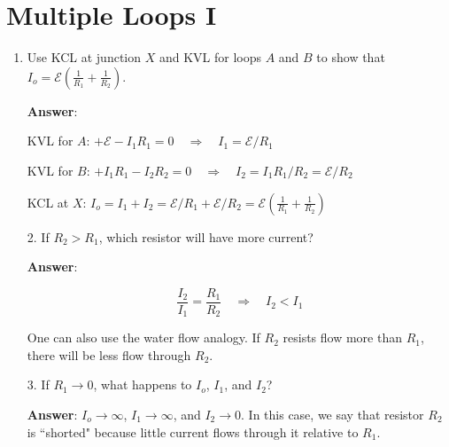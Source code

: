 \documentclass{article}
\begin{document}
\ifsolutions

\else

\newpage
\fi

\section{Multiple Loops I}



\begin{enumerate}

  \item Use KCL at junction $X$ and KVL for loops $A$ and $B$ to show that $I_o=\mathcal{E}\left(\frac{1}{R_1}+\frac{1}{R_2}\right)$.

        \ifsolutions
        \textbf{Answer}:

        KVL for $A$: $+\mathcal{E}-I_1R_1=0\quad\Rightarrow\quad I_1=\mathcal{E}/R_1$

        KVL for $B$: $+I_1R_1-I_2R_2=0 \quad\Rightarrow\quad I_2 = I_1 R_1/R_2 = \mathcal{E}/R_2$

        KCL at $X$: $I_o=I_1+I_2 = \mathcal{E}/R_1 + \mathcal{E}/R_2 = \mathcal{E}\left(\frac{1}{R_1}+\frac{1}{R_2}\right)$
        \else
        \vskip 120pt
        \fi

\end{enumerate}

\begin{enumerate}

  \item[2.] If $R_2 > R_1$, which resistor will have more current?

            \ifsolutions
            \textbf{Answer}:

            $$\frac{I_2}{I_1} = \frac{R_1}{R_2} \quad \Rightarrow \quad I_2 < I_1$$ 

            One can also use the water flow analogy. If $R_2$ resists flow more than $R_1$, there will be less flow through $R_2$.
            \else
            \vskip 60pt
            \fi

  \item[3.] If $R_1 \rightarrow 0$, what happens to $I_o$, $I_1$, and $I_2$?

            \ifsolutions
            \textbf{Answer}: $I_o \rightarrow \infty$, $I_1 \rightarrow \infty$, and $I_2\rightarrow 0$. In this case, we say that resistor $R_2$ is ``shorted" because little current flows through it relative to $R_1$.
            \else

            \newpage
            \fi

\end{enumerate}
\end{document}
